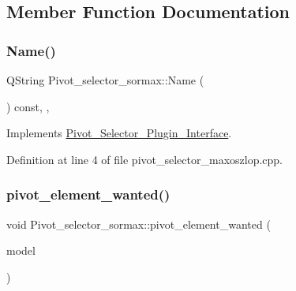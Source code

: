 \subsection{Member Function Documentation}
\mbox{\label{classPivot__selector__sormax_a72875b6810a0f83c77ff2abde1b186a4}} 
\subsubsection{\texorpdfstring{Name()}{Name()}}
{\footnotesize\ttfamily Q\+String Pivot\+\_\+selector\+\_\+sormax\+::\+Name (\begin{DoxyParamCaption}{ }\end{DoxyParamCaption}) const\hspace{0.3cm}{\ttfamily [override]}, {\ttfamily [private]}, {\ttfamily [virtual]}}



Implements \hyperlink{classPivot__Selector__Plugin__Interface_a35b4215e27a169edc2260f2e578de184}{Pivot\+\_\+\+Selector\+\_\+\+Plugin\+\_\+\+Interface}.



Definition at line 4 of file pivot\+\_\+selector\+\_\+maxoszlop.\+cpp.

\mbox{\label{classPivot__selector__sormax_acfb3f057c0d2dd29b33ef23d547dfe36}} 
\subsubsection{\texorpdfstring{pivot\+\_\+element\+\_\+wanted()}{pivot\_element\_wanted()}}
{\footnotesize\ttfamily void Pivot\+\_\+selector\+\_\+sormax\+::pivot\+\_\+element\+\_\+wanted (\begin{DoxyParamCaption}\item[{Q\+Standard\+Item\+Model $\ast$}]{model }\end{DoxyParamCaption})\hspace{0.3cm}{\ttfamily [virtual]}}



